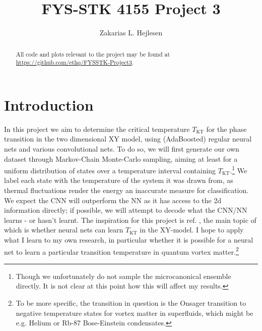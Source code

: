 \documentclass[]{article}
\title{FYS-STK 4155 Project 3}
\author{Zakarias L. Hejlesen}
\begin{document}
\maketitle

\begin{abstract}
	 All code and plots relevant to the project may be found at \url{https://github.com/ethq/FYSSTK-Project3}.
\end{abstract}

\section{Introduction}
In this project we aim to determine the critical temperature $T_\text{KT}$ for the phase transition in the two dimensional XY model, using (AdaBoosted) regular neural nets and various convolutional nets. To do so, we will first generate our own dataset through Markov-Chain Monte-Carlo sampling, aiming at least for a uniform distribution of states over a temperature interval containing $T_\text{KT}$.\footnote{Though we unfortunately do not sample the microcanonical ensemble directly. It is not clear at this point how this will affect my results.} We label each state with the temperature of the system it was drawn from, as thermal fluctuations render the energy an inaccurate measure for classification. We expect the CNN will outperform the NN as it has access to the 2d information directly; if possible, we will attempt to decode what the CNN/NN learns - or hasn't learnt. The inspiration for this project is ref. \cite{PhysRevB.97.045207}, the main topic of which is whether neural nets can learn $T_\text{KT}$ in the XY-model. I hope to apply what I learn to my own research, in particular whether it is possible for a neural net to learn a particular transition temperature in quantum vortex matter.\footnote{To be more specific, the transition in question is the Onsager transition to negative temperature states for vortex matter in superfluids, which might be e.g. Helium or Rb-87 Bose-Einstein condensates.}
\end{document}
